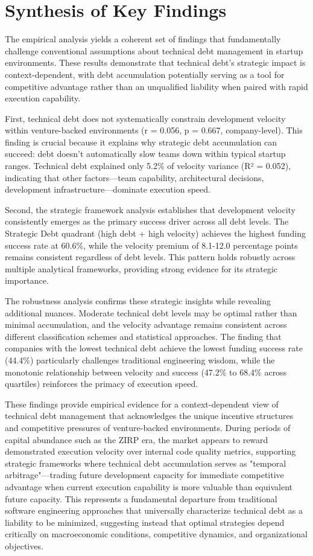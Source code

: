 \section{Synthesis of Key Findings}\label{sec:results_synthesis}

The empirical analysis yields a coherent set of findings that fundamentally challenge conventional assumptions about technical debt management in startup environments. These results demonstrate that technical debt's strategic impact is context-dependent, with debt accumulation potentially serving as a tool for competitive advantage rather than an unqualified liability when paired with rapid execution capability.

First, technical debt does not systematically constrain development velocity within venture-backed environments (r = 0.056, p = 0.667, company-level). This finding is crucial because it explains why strategic debt accumulation can succeed: debt doesn't automatically slow teams down within typical startup ranges. Technical debt explained only 5.2\% of velocity variance (R² = 0.052), indicating that other factors—team capability, architectural decisions, development infrastructure—dominate execution speed.

Second, the strategic framework analysis establishes that development velocity consistently emerges as the primary success driver across all debt levels. The Strategic Debt quadrant (high debt + high velocity) achieves the highest funding success rate at 60.6\%, while the velocity premium of 8.1-12.0 percentage points remains consistent regardless of debt levels. This pattern holds robustly across multiple analytical frameworks, providing strong evidence for its strategic importance.

The robustness analysis confirms these strategic insights while revealing additional nuances. Moderate technical debt levels may be optimal rather than minimal accumulation, and the velocity advantage remains consistent across different classification schemes and statistical approaches. The finding that companies with the lowest technical debt achieve the lowest funding success rate (44.4\%) particularly challenges traditional engineering wisdom, while the monotonic relationship between velocity and success (47.2\% to 68.4\% across quartiles) reinforces the primacy of execution speed.

These findings provide empirical evidence for a context-dependent view of technical debt management that acknowledges the unique incentive structures and competitive pressures of venture-backed environments. During periods of capital abundance such as the \ac{ZIRP} era, the market appears to reward demonstrated execution velocity over internal code quality metrics, supporting strategic frameworks where technical debt accumulation serves as "temporal arbitrage"—trading future development capacity for immediate competitive advantage when current execution capability is more valuable than equivalent future capacity. This represents a fundamental departure from traditional software engineering approaches that universally characterize technical debt as a liability to be minimized, suggesting instead that optimal strategies depend critically on macroeconomic conditions, competitive dynamics, and organizational objectives.
